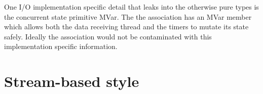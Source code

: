 One I/O implementation specific detail that leaks into the otherwise pure types is the concurrent state primitive MVar. The the association has an MVar member which allows both the data receiving thread and the timers to mutate its state safely. Ideally the association would not be contaminated with this implementation specific information.




\section{Stream-based style}
